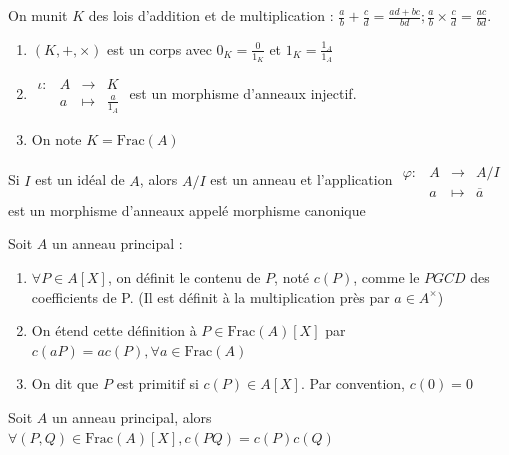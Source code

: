 \documentclass[]{report}
\begin{document}
    \begin{prop}{}{}
        On munit $K$ des lois d'addition et de multiplication : $\frac{a}{b}+\frac{c}{d}=\frac{ad+bc}{bd};\frac{a}{b}\times\frac{c}{d}=\frac{ac}{bd}$. \begin{enumerate}
            \item $(K,+,\times)$ est un corps avec $0_K=\frac{0}{1_K}$ et $1_K=\frac{1_A}{1_A}$
            \item $\begin{array}{ccccc}
    \iota : & A & \to & K \\
    & a & \mapsto & \frac{a}{1_A}
    \end{array}$ est un morphisme d'anneaux injectif.
            \item On note $K=\text{Frac}(A)$
        \end{enumerate}
    \end{prop}

    \begin{ra}{}{}
        Si $I$ est un idéal de $A$, alors $A/I$ est un anneau et l'application $\begin{array}{ccccc}
    \varphi : & A & \to & A/I \\
      & a & \mapsto & \overline{a}
    \end{array}$ est un morphisme d'anneaux appelé morphisme canonique
    \end{ra}

    \begin{df}{}{}
        Soit $A$ un anneau principal : \begin{enumerate}
            \item $\forall P\in A[X]$, on définit le contenu de $P$, noté $c(P)$, comme le $PGCD$ des coefficients de P. (Il est définit à la multiplication près par $a\in A^\times$)
            \item On étend cette définition à $P\in\text{Frac}(A)[X]$ par $c(aP)=ac(P),\forall a\in\text{Frac}(A)$
            \item On dit que $P$ est primitif si $c(P)\in A[X]$. Par convention, $c(0)=0$
        \end{enumerate}
    \end{df}

    \begin{prop}{}{}
        Soit $A$ un anneau principal, alors $\forall(P,Q)\in \text{Frac}(A)[X],c(PQ)=c(P)c(Q)$
    \end{prop}
\end{document}
